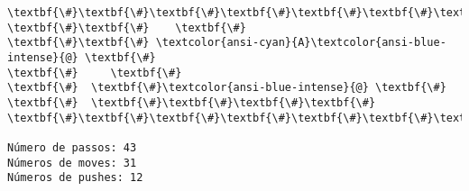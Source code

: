 \documentclass[11pt]{article}
\begin{document}
\begin{Verbatim}[commandchars=\\\{\}]
\textbf{\#}\textbf{\#}\textbf{\#}\textbf{\#}\textbf{\#}\textbf{\#}\textbf{\#}
\textbf{\#}\textbf{\#}    \textbf{\#}
\textbf{\#}\textbf{\#} \textcolor{ansi-cyan}{A}\textcolor{ansi-blue-intense}{@} \textbf{\#}
\textbf{\#}     \textbf{\#}
\textbf{\#}  \textbf{\#}\textcolor{ansi-blue-intense}{@} \textbf{\#}
\textbf{\#}  \textbf{\#}\textbf{\#}\textbf{\#}\textbf{\#}
\textbf{\#}\textbf{\#}\textbf{\#}\textbf{\#}\textbf{\#}\textbf{\#}\textbf{\#}

Número de passos: 43
Números de moves: 31
Números de pushes: 12

    \end{Verbatim}


    
    
    
    
\end{document}
